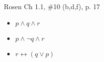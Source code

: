 \documentclass[12pt]{exam}
\newenvironment{my_parts}{
\begin{parts}
    \setlength{\itemsep}{1pt}
    \setlength{\parskip}{0pt}
    \setlength{\parsep}{0pt}
}{\end{parts}}
\begin{document}
\begin{questions}
\question Rosen Ch 1.1, \#10 (b,d,f), p. 17
    \begin{solution}
        \begin{itemize}
        \item[\hspace*{0.in}(b)] $p \wedge q \wedge r$
        \item[(d)] $p \wedge \neg q \wedge r$
        \item[(f)] $r \leftrightarrow (q \vee p)$
        \end{itemize}
    \end{solution}


\end{questions}
\end{document}
